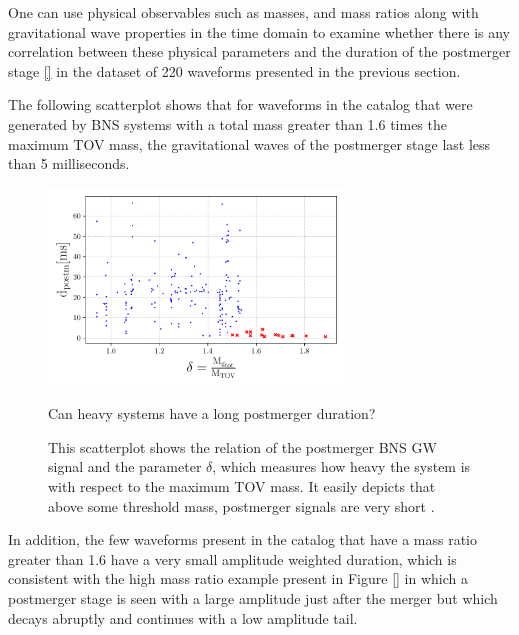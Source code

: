 \FloatBarrier 


One can use physical observables such as masses, and mass ratios along with gravitational wave properties in the time domain to examine whether there is any correlation between these physical parameters and the duration of the postmerger stage \ref{} in the dataset of 220 waveforms presented in the previous section. 

The following scatterplot shows that for waveforms in the catalog that were generated by BNS systems with a total mass greater than 1.6 times the maximum TOV mass, the gravitational waves of the postmerger stage last less than 5 milliseconds.

\begin{figure}[hbt!]
\begin{center}
\includegraphics[width=0.7\textwidth, angle=0]{images/Data_analysis/results/res0.pdf}
\captionsetup{width=0.8\textwidth}
\caption{Can heavy systems have a long postmerger duration?}
\caption*{This scatterplot shows the relation of the postmerger BNS GW signal and the parameter $\delta$, which measures how heavy the system is with respect to the maximum TOV mass. It easily depicts that above some threshold mass, postmerger signals are very short \cite{Kashyap_2022}.}
\label{heavy systems}
\end{center}
\end{figure}


In addition, the few waveforms present in the catalog that have a mass ratio greater than 1.6 have a very small amplitude weighted duration, which is consistent with the high mass ratio example present in Figure \ref{} in which a postmerger stage is seen with a large amplitude just after the merger but which decays abruptly and continues with a low amplitude tail.


